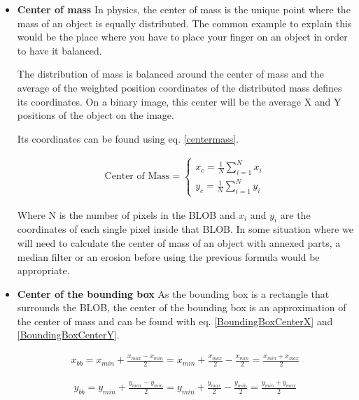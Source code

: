 {\begin{itemize}
\item \textbf{Center of mass}
In physics, the center of mass is the unique point where the mass of an object is equally distributed. The common example to explain this would be the place where you have to place your finger on an object in order to have it balanced.

The distribution of mass is balanced around the center of mass and the average of the weighted position coordinates of the distributed mass defines its coordinates. On a binary image, this center will be the average X and Y positions of the object on the image.

Its coordinates can be found using eq. \ref{centermass}.

\begin{equation}
	\begin{aligned}
  		\ \text{Center of Mass} = \left\{ \begin{array}{ll}
         x_{c}=\displaystyle\frac{1}{N} \displaystyle\sum_{i=1}^N x_{i}\\
         y_{c}=\displaystyle\frac{1}{N} \displaystyle\sum_{i=1}^N y_{i}
        \end{array} \right . \ 
\label{centermass} 	
 	\end{aligned}
\end{equation} 


Where N is the number of pixels in the BLOB and $x_i$ and $y_i$ are the coordinates of each single pixel inside that BLOB. In some situation where we will need to calculate the center of mass of an object with annexed parts, a median filter or an erosion before using the previous formula would be appropriate.

\item \textbf{Center of the bounding box}
As the bounding box is a rectangle that surrounds the BLOB, the center of the bounding box is an approximation of the center of mass and can be found with eq. \ref{BoundingBoxCenterX} and \ref{BoundingBoxCenterY}.

\begin{equation}
	\begin{aligned}	x_{bb}=x_{min}+\displaystyle\frac{x_{max}-x_{min}}{2}=x_{min}+\displaystyle\frac{x_{max}}{2}-\displaystyle\frac{x_{min}}{2}=\displaystyle\frac{x_{min}+x_{max}}{2}
	\label{BoundingBoxCenterX}
	\end{aligned}
\end{equation}

\begin{equation}	
	\begin{aligned}
	y_{bb}=y_{min}+\displaystyle\frac{y_{max}-y_{min}}{2}=y_{min}+\displaystyle\frac{y_{max}}{2}-\displaystyle\frac{y_{min}}{2}=\displaystyle\frac{y_{min}+y_{max}}{2}
	\label{BoundingBoxCenterY}
	\end{aligned}
\end{equation}



\end{itemize}}
